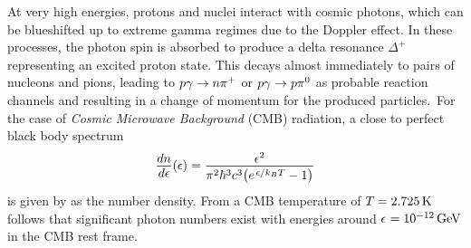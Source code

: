 At very high energies, protons and nuclei interact with cosmic photons, which can be blueshifted up to extreme gamma regimes due to
the Doppler effect. In these processes, the photon spin is absorbed to produce a delta resonance $\Delta^+$ representing an excited
proton state. This decays almost immediately to pairs of nucleons and pions, leading to $p\gamma \rightarrow \kern-0.1pt n\smash{\pi^+}$
or $p\gamma \rightarrow \kern+0.2pt p \smash{\pi^0}$ as probable reaction channels and resulting in a change of momentum for the
produced particles.~For the case of \emph{Cosmic Microwave Background} (CMB) radiation, a close to perfect black body spectrum
\begin{equation*}
	\frac{\raisebox{-0.3ex}{$dn$}}{\raisebox{0.15ex}{$d\epsilon$}} (\epsilon) \kern+0.2pt =
	\frac{\raisebox{-0.3ex}{$\epsilon^2$}}{\pi^2 \hbar^3 c^3 \bigl( e^{\kern+1.0pt \epsilon / k_B T} - 1 \bigr)}
\end{equation*}
is given by \cite{Gaisser_2016} as the number density. From a CMB temperature of $T \kern-0.5pt = \qty{2.725}{\kelvin}$ follows that
significant photon numbers exist with energies around $\epsilon \kern+0.5pt = \qty{e-12}{\giga\electronvolt}$ in the CMB rest frame. 

\newpage

